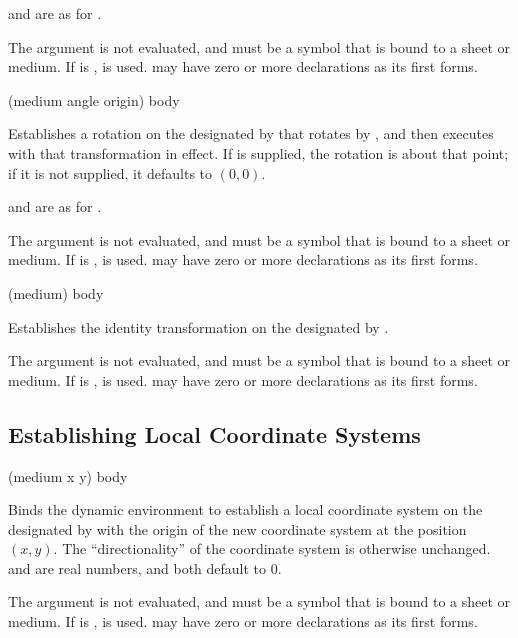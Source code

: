  and  are as for .

The  argument is not evaluated, and must be a symbol that is bound
to a sheet or medium.  If  is ,  is
used.   may have zero or more declarations as its first forms.

 {(medium angle \optional origin) \body body}

Establishes a rotation on the  designated by  that
rotates by , and then executes  with that transformation in
effect.  If  is supplied, the rotation is about that point; if it is
not supplied, it defaults to $(0,0)$.

 and  are as for .

The  argument is not evaluated, and must be a symbol that is bound
to a sheet or medium.  If  is ,  is
used.   may have zero or more declarations as its first forms.

 {(medium) \body body}

Establishes the identity transformation on the  designated
by .

The  argument is not evaluated, and must be a symbol that is bound
to a sheet or medium.  If  is ,  is
used.   may have zero or more declarations as its first forms.



\subsection {Establishing Local Coordinate Systems}

 {(medium \optional x y) \body body}

Binds the dynamic environment to establish a local coordinate system on the
 designated by  with the origin of the new coordinate
system at the position $(x,y)$.  The ``directionality'' of the coordinate system
is otherwise unchanged.   and  are real numbers, and both default
to 0.

The  argument is not evaluated, and must be a symbol that is bound
to a sheet or medium.  If  is ,  is
used.   may have zero or more declarations as its first forms.

